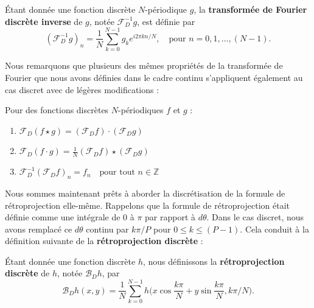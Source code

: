 \begin{definition}
Étant donnée une fonction discrète $N$-périodique $g$, la \textbf{transformée de Fourier discrète inverse} de $g$, notée $\mathcal{F}_D^{-1} g$, est définie par
\begin{equation}
(\mathcal{F}_D^{-1} g)_n = \frac{1}{N} \sum_{k=0}^{N-1} g_k e^{i 2 \pi k n / N}, \quad \text{pour } n = 0, 1, \dots, (N-1).
\end{equation}
\end{definition}

Nous remarquons que plusieurs des mêmes propriétés de la transformée de Fourier que nous avons définies dans le cadre continu s'appliquent également au cas discret avec de légères modifications :

\begin{proposition}
Pour des fonctions discrètes $N$-périodiques $f$ et $g$ :
\begin{enumerate}
    \item $\mathcal{F}_D(f \star g) = (\mathcal{F}_D f) \cdot (\mathcal{F}_D g)$
    \item $\mathcal{F}_D(f \cdot g) = \frac{1}{N} (\mathcal{F}_D f) \star (\mathcal{F}_D g)$
    \item $\mathcal{F}_D^{-1}(\mathcal{F}_D f)_n = f_n \quad \text{pour tout } n \in \mathbb{Z}$
\end{enumerate}
\end{proposition}

Nous sommes maintenant prêts à aborder la discrétisation de la formule de rétroprojection elle-même. Rappelons que la formule de rétroprojection était définie comme une intégrale de $0$ à $\pi$ par rapport à $d\theta$. Dans le cas discret, nous avons remplacé ce $d\theta$ continu par $k\pi / P$ pour $0 \le k \le (P-1)$. Cela conduit à la définition suivante de la \textbf{rétroprojection discrète} :

\begin{definition}
Étant donnée une fonction discrète $h$, nous définissons la \textbf{rétroprojection discrète} de $h$, notée $\mathcal{B}_D h$, par
\begin{equation}
\mathcal{B}_D h(x,y) = \frac{1}{N} \sum_{k=0}^{N-1} h \big(x \cos \frac{k \pi}{N} + y \sin \frac{k \pi}{N}, k \pi / N \big).
\label{eq:discrete_backprojection}
\end{equation}
\end{definition}

